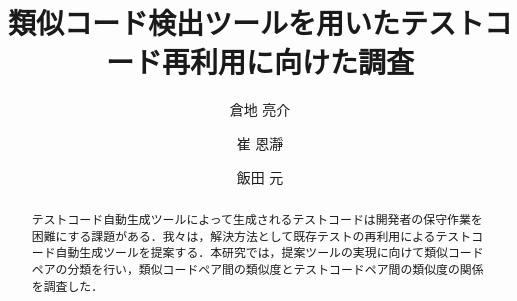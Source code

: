\documentclass{fose2019}           %
\title{類似コード検出ツールを用いたテストコード再利用に向けた調査}
\author{倉地 亮介}{Ryosuke Kurachi, 奈良先端科学技術大学院大学}
\author{崔 恩瀞}{Eunjong Choi, 京都工芸繊維大学}
\author{飯田 元}{Hazimu Iida, 奈良先端科学技術大学院大学}
\begin{document}
\maketitle


\begin{abstract}
テストコード自動生成ツールによって生成されるテストコードは開発者の保守作業を困難にする課題がある．我々は，解決方法として既存テストの再利用によるテストコード自動生成ツールを提案する．本研究では，提案ツールの実現に向けて類似コードペアの分類を行い，類似コードペア間の類似度とテストコードペア間の類似度の関係を調査した．
\end{abstract}

\end{document}
